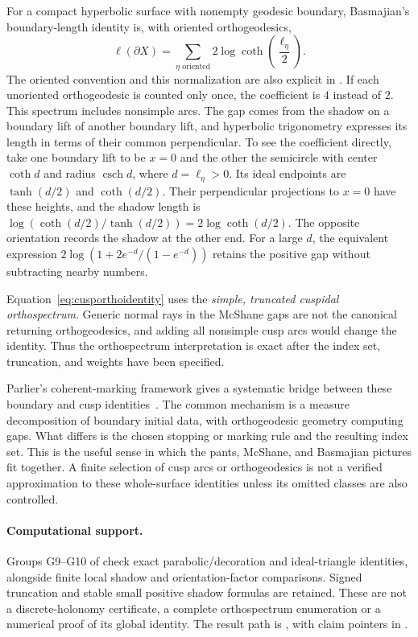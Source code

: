 For a compact hyperbolic surface with nonempty geodesic boundary,
Basmajian's boundary-length identity is, with oriented orthogeodesics,
\begin{equation}
 \ell(\partial X)=
 \sum_{\eta\text{ oriented}}2\log\coth\left(\frac{\ell_\eta}{2}\right).
 \label{eq:basmajian}
\end{equation}
The oriented convention and this normalization are also explicit in
\cite[Section 4.2, p.~26]{Parlier}.
If each unoriented orthogeodesic is counted only once, the coefficient is
$4$ instead of $2$. This spectrum includes nonsimple arcs. The gap comes
from the shadow on a boundary lift of another boundary lift, and
hyperbolic trigonometry expresses its length in terms of their common
perpendicular. To see the coefficient directly, take one boundary lift
to be $x=0$ and the other the semicircle with center $\coth d$ and
radius $\operatorname{csch}d$, where $d=\ell_\eta>0$. Its ideal endpoints
are $\tanh(d/2)$ and $\coth(d/2)$. Their perpendicular projections to
$x=0$ have these heights, and the shadow length is
$\log(\coth(d/2)/\tanh(d/2))=2\log\coth(d/2)$.
The opposite orientation records the shadow at the other end. For a
large $d$, the equivalent expression
$2\log(1+2e^{-d}/(1-e^{-d}))$ retains the positive gap without subtracting
nearby numbers.

Equation~\eqref{eq:cusporthoidentity} uses the \emph{simple, truncated
cuspidal orthospectrum}. Generic normal rays in the McShane gaps are not
the canonical returning orthogeodesics, and adding all nonsimple cusp arcs
would change the identity. Thus the orthospectrum interpretation is exact
after the index set, truncation, and weights have been specified.

Parlier's coherent-marking framework gives a systematic bridge between
these boundary and cusp identities~\cite{Parlier}. The common mechanism
is a measure decomposition of boundary initial data, with orthogeodesic
geometry computing gaps. What differs is the chosen stopping or marking
rule and the resulting index set. This is the useful sense in which the
pants, McShane, and Basmajian pictures fit together. A finite selection
of cusp arcs or orthogeodesics is not a verified approximation to these
whole-surface identities unless its omitted classes are also controlled.

\paragraph{Computational support.}
Groups G9--G10 of 
check exact parabolic/decoration and ideal-triangle identities,
alongside finite local shadow and orientation-factor comparisons.
Signed truncation and stable small positive shadow formulas are
retained. These are not a discrete-holonomy certificate, a complete
orthospectrum enumeration or a numerical proof of its global identity.
The result path is ,
with claim pointers in .
